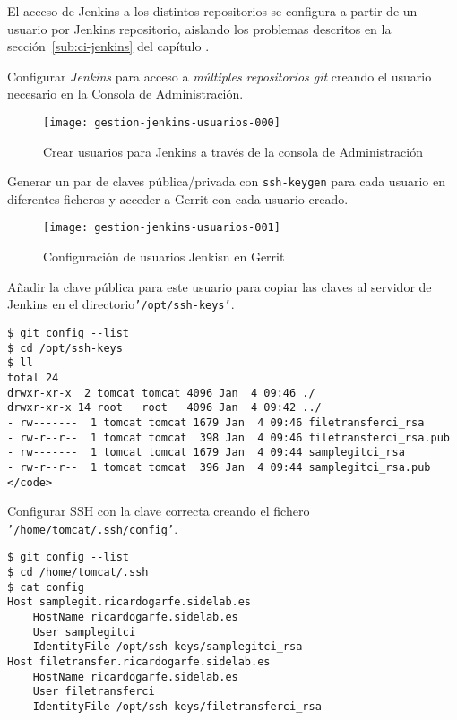 \par El acceso de Jenkins a los distintos repositorios se configura a partir de un usuario por Jenkins repositorio, aislando los problemas descritos en la sección~\ref{sub:ci-jenkins} del capítulo .

\par Configurar \emph{Jenkins} para acceso a \emph{múltiples repositorios git} creando el usuario necesario en la Consola de Administración.

\begin{figure}[H]
    \centering
    \texttt{[image: gestion-jenkins-usuarios-000]}
    \caption{Crear usuarios para Jenkins a través de la consola de Administración}
    \label{fig:gestion-jenkins-usuarios-000}
\end{figure}

\par Generar un par de claves pública/privada con \texttt{ssh-keygen} para cada usuario en diferentes ficheros y acceder a Gerrit con cada usuario creado.

\begin{figure}[H]
    \centering
    \texttt{[image: gestion-jenkins-usuarios-001]}
    \caption{Configuración de usuarios Jenkisn en Gerrit}
    \label{fig:gestion-jenkins-usuarios-001}
\end{figure}

\par Añadir la clave pública para este usuario para copiar las claves al servidor de Jenkins en el directorio\texttt{'/opt/ssh-keys'}.

\lstset{style=bashbasico}
\begin{lstlisting}[frame=trbl]
$ git config --list
$ cd /opt/ssh-keys
$ ll
total 24
drwxr-xr-x  2 tomcat tomcat 4096 Jan  4 09:46 ./
drwxr-xr-x 14 root   root   4096 Jan  4 09:42 ../
- rw-------  1 tomcat tomcat 1679 Jan  4 09:46 filetransferci_rsa
- rw-r--r--  1 tomcat tomcat  398 Jan  4 09:46 filetransferci_rsa.pub
- rw-------  1 tomcat tomcat 1679 Jan  4 09:44 samplegitci_rsa
- rw-r--r--  1 tomcat tomcat  396 Jan  4 09:44 samplegitci_rsa.pub
</code>
\end{lstlisting}

\par Configurar SSH con la clave correcta creando el fichero \texttt{'/home/tomcat/.ssh/config'}.

\lstset{style=bashbasico}
\begin{lstlisting}[frame=trbl]
$ git config --list
$ cd /home/tomcat/.ssh
$ cat config
Host samplegit.ricardogarfe.sidelab.es
    HostName ricardogarfe.sidelab.es
    User samplegitci
    IdentityFile /opt/ssh-keys/samplegitci_rsa
Host filetransfer.ricardogarfe.sidelab.es
    HostName ricardogarfe.sidelab.es
    User filetransferci
    IdentityFile /opt/ssh-keys/filetransferci_rsa
\end{lstlisting}

